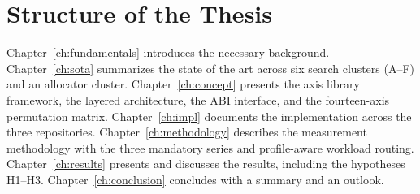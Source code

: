 \section{Structure of the Thesis}\label{sec:structure}

Chapter~\ref{ch:fundamentals} introduces the necessary background. Chapter~\ref{ch:sota}
summarizes the state of the art across six search clusters (A--F) and an
allocator cluster. Chapter~\ref{ch:concept} presents the axis library framework,
the layered architecture, the ABI interface, and the fourteen-axis permutation
matrix. Chapter~\ref{ch:impl} documents the implementation across the three
repositories. Chapter~\ref{ch:methodology} describes the measurement methodology
with the three mandatory series and profile-aware workload routing.
Chapter~\ref{ch:results} presents and discusses the results, including the
hypotheses H1--H3. Chapter~\ref{ch:conclusion} concludes with a summary and an
outlook.
